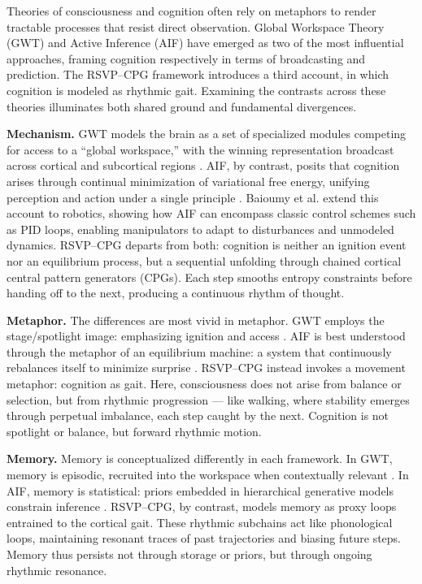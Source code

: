 \documentclass{article}
\begin{document}
Theories of consciousness and cognition often rely on metaphors to render tractable processes that resist direct observation. Global Workspace Theory (GWT) and Active Inference (AIF) have emerged as two of the most influential approaches, framing cognition respectively in terms of broadcasting and prediction. The RSVP--CPG framework introduces a third account, in which cognition is modeled as rhythmic gait. Examining the contrasts across these theories illuminates both shared ground and fundamental divergences.

\textbf{Mechanism.} GWT models the brain as a set of specialized modules competing for access to a “global workspace,” with the winning representation broadcast across cortical and subcortical regions \citep{baars1997theater, dehaene2011experimental}. AIF, by contrast, posits that cognition arises through continual minimization of variational free energy, unifying perception and action under a single principle \citep{friston2010free, friston2017graphical}. Baioumy et al. \citep{baioumy2021active} extend this account to robotics, showing how AIF can encompass classic control schemes such as PID loops, enabling manipulators to adapt to disturbances and unmodeled dynamics. RSVP--CPG departs from both: cognition is neither an ignition event nor an equilibrium process, but a sequential unfolding through chained cortical central pattern generators (CPGs). Each step smooths entropy constraints before handing off to the next, producing a continuous rhythm of thought.

\textbf{Metaphor.} The differences are most vivid in metaphor. GWT employs the stage/spotlight image: emphasizing ignition and access \citep{baars1997theater}. AIF is best understood through the metaphor of an equilibrium machine: a system that continuously rebalances itself to minimize surprise \citep{friston2010free}. RSVP--CPG instead invokes a movement metaphor: cognition as gait. Here, consciousness does not arise from balance or selection, but from rhythmic progression — like walking, where stability emerges through perpetual imbalance, each step caught by the next. Cognition is not spotlight or balance, but forward rhythmic motion.

\textbf{Memory.} Memory is conceptualized differently in each framework. In GWT, memory is episodic, recruited into the workspace when contextually relevant \citep{dehaene2001towards}. In AIF, memory is statistical: priors embedded in hierarchical generative models constrain inference \citep{friston2017graphical}. RSVP--CPG, by contrast, models memory as proxy loops entrained to the cortical gait. These rhythmic subchains act like phonological loops, maintaining resonant traces of past trajectories and biasing future steps. Memory thus persists not through storage or priors, but through ongoing rhythmic resonance.
\end{document}
